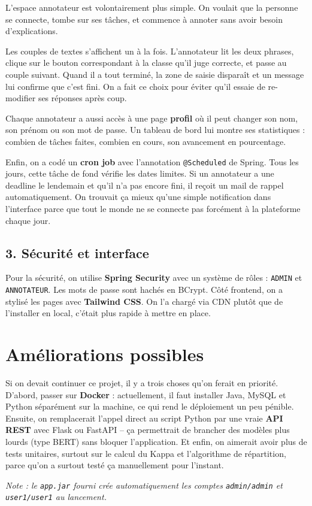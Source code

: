 \documentclass[11pt,a4paper]{article}
\begin{document}
L'espace annotateur est volontairement plus simple. On voulait que la personne se connecte, tombe sur ses tâches, et commence à annoter sans avoir besoin d'explications.

Les couples de textes s'affichent un à la fois. L'annotateur lit les deux phrases, clique sur le bouton correspondant à la classe qu'il juge correcte, et passe au couple suivant. Quand il a tout terminé, la zone de saisie disparaît et un message lui confirme que c'est fini. On a fait ce choix pour éviter qu'il essaie de re-modifier ses réponses après coup.

Chaque annotateur a aussi accès à une page \textbf{profil} où il peut changer son nom, son prénom ou son mot de passe. Un tableau de bord lui montre ses statistiques : combien de tâches faites, combien en cours, son avancement en pourcentage.

Enfin, on a codé un \textbf{cron job} avec l'annotation \texttt{@Scheduled} de Spring. Tous les jours, cette tâche de fond vérifie les dates limites. Si un annotateur a une deadline le lendemain et qu'il n'a pas encore fini, il reçoit un mail de rappel automatiquement. On trouvait ça mieux qu'une simple notification dans l'interface parce que tout le monde ne se connecte pas forcément à la plateforme chaque jour.

\subsection{3. Sécurité et interface}

Pour la sécurité, on utilise \textbf{Spring Security} avec un système de rôles : \texttt{ADMIN} et \texttt{ANNOTATEUR}. Les mots de passe sont hachés en BCrypt. Côté frontend, on a stylisé les pages avec \textbf{Tailwind CSS}. On l'a chargé via CDN plutôt que de l'installer en local, c'était plus rapide à mettre en place.

\section{Améliorations possibles}

Si on devait continuer ce projet, il y a trois choses qu'on ferait en priorité. D'abord, passer sur \textbf{Docker} : actuellement, il faut installer Java, MySQL et Python séparément sur la machine, ce qui rend le déploiement un peu pénible. Ensuite, on remplacerait l'appel direct au script Python par une vraie \textbf{API REST} avec Flask ou FastAPI -- ça permettrait de brancher des modèles plus lourds (type BERT) sans bloquer l'application. Et enfin, on aimerait avoir plus de tests unitaires, surtout sur le calcul du Kappa et l'algorithme de répartition, parce qu'on a surtout testé ça manuellement pour l'instant.

\vspace{0.8cm}
\begin{center}
    \small\textit{Note : le \texttt{app.jar} fourni crée automatiquement les comptes \texttt{admin/admin} et \texttt{user1/user1} au lancement.}
\end{center}
\end{document}
